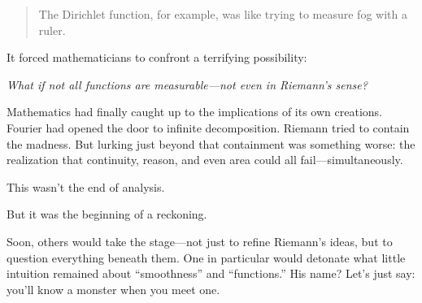 \begin{quote}
The Dirichlet function, for example, was like trying to measure fog with a ruler.
\end{quote}

It forced mathematicians to confront a terrifying possibility:

\begin{center}
\emph{What if not all functions are measurable—not even in Riemann’s sense?}
\end{center}

Mathematics had finally caught up to the implications of its own creations. Fourier had opened the door to infinite decomposition. Riemann tried to contain the madness. But lurking just beyond that containment was something worse: the realization that continuity, reason, and even area could all fail—simultaneously.

\medskip

This wasn’t the end of analysis.

But it was the beginning of a reckoning.

Soon, others would take the stage—not just to refine Riemann’s ideas, but to question everything beneath them. One in particular would detonate what little intuition remained about “smoothness” and “functions.” His name? Let’s just say: you’ll know a monster when you meet one.
